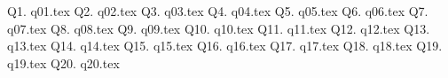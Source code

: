 

\newcommand\myincludetex[1]{\textbox{{\scriptsize \texttt{#1}}}

    
}

\newcommand\myincludesrc[1]{\textbox{{\scriptsize \texttt{#1}}}
    
\VerbatimInput[fontsize=\footnotesize,frame=single]{#1}
}


\newpage 
\newpage Q1. {q01.tex}
\newpage Q2. {q02.tex}
\newpage Q3. {q03.tex}
\newpage Q4. {q04.tex}
\newpage Q5. {q05.tex}
\newpage Q6. {q06.tex}
\newpage Q7. {q07.tex}
\newpage Q8. {q08.tex}
\newpage 
\newpage Q9. {q09.tex}
\newpage Q10. {q10.tex}
\newpage Q11. {q11.tex}
\newpage Q12. {q12.tex}
\newpage Q13. {q13.tex}
\newpage Q14. {q14.tex}
\newpage 
\newpage Q15. {q15.tex}
\newpage Q16. {q16.tex}
\newpage Q17. {q17.tex}
\newpage Q18. {q18.tex}
\newpage Q19. {q19.tex}
\newpage Q20. {q20.tex}
\newpage 


    